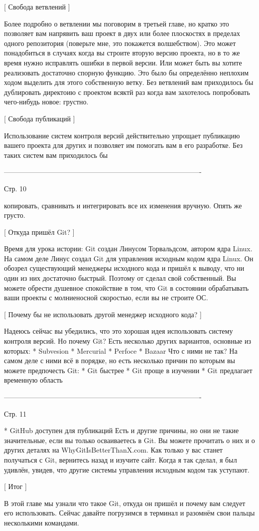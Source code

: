 [ Свобода ветвлений ]

Более подробно о ветвлении мы поговорим в третьей главе, но кратко это позволяет вам
напрявить ваш проект в двух или более плоскостях в пределах одного репозитория
(поверьте мне, это покажется волшебством). Это может понадобиться в случаях когда
вы строите вторую версию проекта, но в то же время нужно исправлять ошибки в первой 
версии. Или может быть вы хотите реализовать достаточно спорную функцию. Это было бы
определённо неплохим ходом выделить для этого собственную ветку. Без ветвлений вам 
приходилось бы дублировать директоию с проектом всяктй раз когда вам захотелось
попробовать чего-нибудь новое: грустно.

[ Свобода публикаций ]

Использование систем контроля версий действительно упрощает публикацию вашего проекта
для других и позволяет им помогать вам в его разработке. Без таких систем вам
приходилось бы 

-------------------------------------------------------------------------------------

Стр. 10

копировать, сравнивать и интегрировать все их изменения вручную. Опять
же грусто.

[ Откуда пришёл Git? ]

Время для урока истории: Git создан Линусом Торвальдсом, автором ядра Linux. На самом
деле Линус создал Git для управления исходным кодом ядра Linux. Он обозрел
существующий менеджеры исходного кода и пришёл к выводу, что ни один из них
достаточно быстрый. Поэтому от сделал свой собственный. Вы можете обрести душевное
спокойствие в том, что Git в состоянии обрабатывать ваши проекты с молниеносной
скоростью, если вы не строите ОС.

[ Почему бы не использовать другой менеджер исходного кода? ]

Надеюсь сейчас вы убедились, что это хорошая идея использовать систему контроля
версий. Но почему Git? Есть несколько других вариантов, основные из которых:
    * Subvesion
    * Mercurial
    * Perfoce
    * Bazaar
Что с ними не так? На самом деле с ними всё в порядке, но есть несколько причин по
которым вы можете предпочесть Git:
    * Git быстрее
    * Git проще в изучении
    * Git предлагает временную область

-------------------------------------------------------------------------------------

Стр. 11

    * GitHub доступен для публикаций
Есть и другие причины, но они не такие значительные, если вы только осваиваетесь в
Git. Вы можете прочитать о них и о других деталях на WhyGitIsBetterThanX.com. Как
только у вас станет получаться с Git, вернитесь назад и изучите сайт. Когда я так
сделал, я был удивлён, увидев, что другие системы управления исходным кодом так 
уступают.

[ Итог ]

В этой главе мы узнали что такое Git, откуда он пришёл и почему вам следует его 
использовать. Сейчас давайте погрузимся в терминал и разомнём свои пальцы 
несколькими командами.